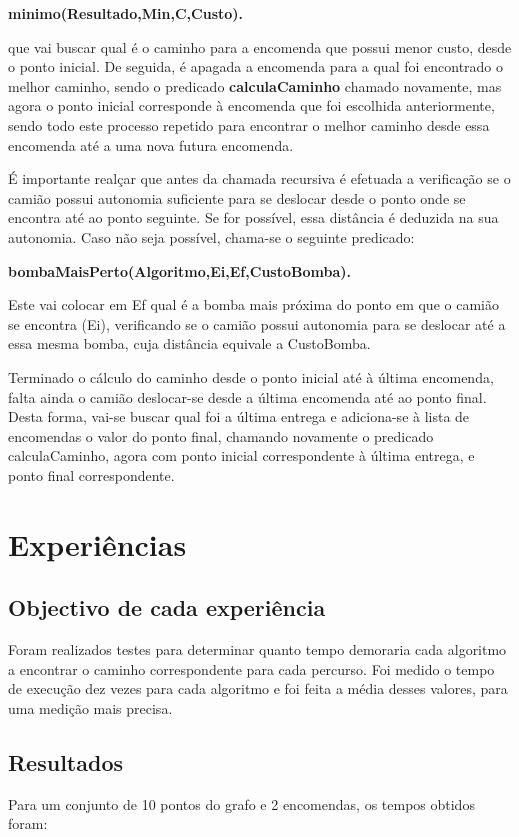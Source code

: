 \documentclass[a4paper]{article}
\begin{document}
\centerline{\textbf{minimo(Resultado,Min,C,Custo).}}

que vai buscar qual é o caminho para a encomenda que possui menor custo, desde o ponto inicial. De seguida, é apagada a encomenda para a qual foi encontrado o melhor caminho, sendo o predicado \textbf{calculaCaminho} chamado novamente, mas agora o ponto inicial corresponde à encomenda que foi escolhida anteriormente, sendo todo este processo repetido para encontrar o melhor caminho desde essa encomenda até a uma nova futura encomenda.

É importante realçar que antes da chamada recursiva é efetuada a verificação se o camião possui autonomia suficiente para se deslocar desde o ponto onde se encontra até ao ponto seguinte. Se for possível, essa distância é deduzida na sua autonomia. Caso não seja possível, chama-se o seguinte predicado:

\centerline{\textbf{bombaMaisPerto(Algoritmo,Ei,Ef,CustoBomba).}}

Este vai colocar em Ef qual é a bomba mais próxima do ponto em que o camião se encontra (Ei), verificando se o camião possui autonomia para se deslocar até a essa mesma bomba, cuja distância equivale a CustoBomba. 

Terminado o cálculo do caminho desde o ponto inicial até à última encomenda, falta ainda o camião deslocar-se desde a última encomenda até ao ponto final. Desta forma, vai-se buscar qual foi a última entrega e adiciona-se à lista de encomendas o valor do ponto final, chamando novamente o predicado calculaCaminho, agora com ponto inicial correspondente à última entrega, e ponto final correspondente.

\newpage

\section{Experiências}

\subsection{Objectivo de cada experiência}
Foram realizados testes para determinar quanto tempo demoraria cada algoritmo a encontrar o caminho correspondente para cada percurso. Foi medido o tempo de execução dez vezes para cada algoritmo e foi feita a média desses valores, para uma medição mais precisa.
\subsection{Resultados}
Para um conjunto de 10 pontos do grafo e 2 encomendas, os tempos obtidos foram:
\end{document}

